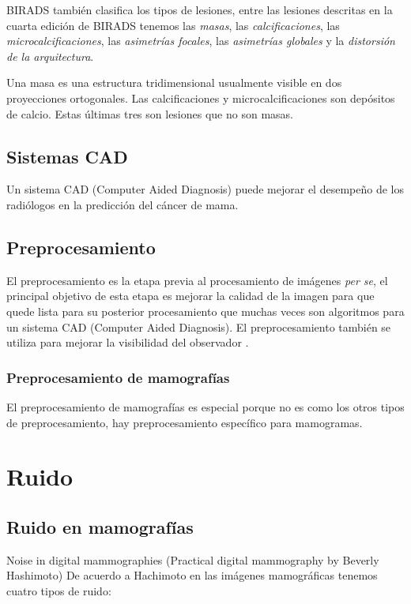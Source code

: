 BIRADS también clasifica los tipos de lesiones, entre las lesiones descritas en
la cuarta edición de BIRADS tenemos las \textit{masas}, las
\textit{calcificaciones}, las \textit{microcalcificaciones}, las
\textit{asimetrías focales}, las \textit{asimetrías globales} y la
\textit{distorsión de la arquitectura}. 

Una masa es una estructura tridimensional usualmente visible en dos
proyecciones ortogonales. Las calcificaciones y microcalcificaciones son
depósitos de calcio. Estas últimas tres son lesiones que no son masas.

\subsection{Sistemas CAD}

Un sistema CAD (Computer Aided Diagnosis) puede mejorar el desempeño de los
radiólogos en la predicción del cáncer de mama.

\subsection{Preprocesamiento}
El preprocesamiento es la etapa previa al procesamiento de imágenes \textit{per
se}, el principal objetivo de esta etapa es mejorar la calidad de la imagen
para que quede lista para su posterior procesamiento \cite{ponraj2011survey}
que muchas veces son algoritmos para un sistema CAD (Computer Aided Diagnosis).
El preprocesamiento también se utiliza para mejorar la visibilidad del
observador \cite{rahmati2010new}. 

\subsubsection{Preprocesamiento de mamografías}
El preprocesamiento de mamografías es especial porque no es como los otros tipos
de preprocesamiento, hay preprocesamiento específico para mamogramas.

\section{Ruido}

\subsection{Ruido en mamografías}

\cite{hashimoto2008practical}
Noise in digital mammographies (Practical digital mammography by Beverly
Hashimoto) De acuerdo a Hachimoto en las imágenes mamográficas tenemos cuatro
tipos de ruido:

